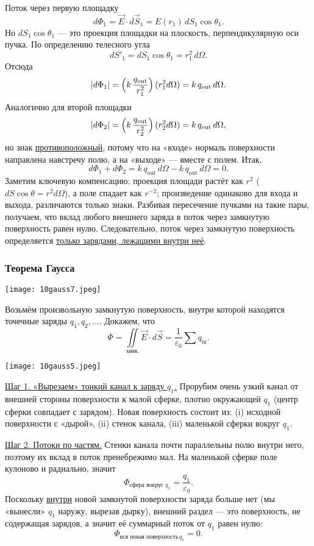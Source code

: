 \documentclass[12pt, a4paper]{article}%
\begin{document}
Поток через первую площадку
\[
d\Phi_1=\vec E\cdot d\vec S_1=E(r_1)\,dS_1\cos\theta_1.
\]
Но \(dS_1\cos\theta_1\) — это проекция площадки на плоскость, перпендикулярную оси пучка. По определению телесного угла
\[
dS'_1=dS_1\cos\theta_1=r_1^2\,d\Omega.
\]
Отсюда
\[
|d\Phi_1|= \Bigl(k\,\frac{q_{\text{out}}}{r_1^2}\Bigr)\,(r_1^2 d\Omega)=k\,q_{\text{out}}\,d\Omega.
\]
Аналогично для второй площадки
\[
|d\Phi_2|= \Bigl(k\,\frac{q_{\text{out}}}{r_2^2}\Bigr)\,(r_2^2 d\Omega)=k\,q_{\text{out}}\,d\Omega,
\]
но знак \underline{противоположный}, потому что на «входе» нормаль поверхности направлена навстречу полю, а на «выходе» — вместе с полем. Итак,
\[
d\Phi_1+d\Phi_2 = k\,q_{\text{out}}\,d\Omega - k\,q_{\text{out}}\,d\Omega = 0.
\]
Заметим ключевую компенсацию: проекция площади растёт как \(r^2\) (\(dS\cos\theta=r^2 d\Omega\)), а поле спадает как \(r^{-2}\); произведение одинаково для входа и выхода, различаются только знаки. Разбивая пересечение пучками на такие пары, получаем, что вклад любого внешнего заряда в поток через замкнутую поверхность равен нулю. Следовательно, поток через замкнутую поверхность определяется \underline{только зарядами, лежащими внутри неё}.

\subsubsection*{Теорема Гаусса}

\begin{center}
\texttt{[image: 10gauss7.jpeg]}
\label{fig:mpr}
\end{center}

Возьмём произвольную замкнутую поверхность, внутри которой находятся точечные заряды $q_1,q_2,\dots$. Докажем, что
\[
\boxed{\,\Phi = \displaystyle \iint\limits_{\text{замк.}} \vec E\cdot d\vec S=\frac{1}{\varepsilon_0}\sum q_{\text{in}}.\,}
\]


\begin{center}
\texttt{[image: 10gauss5.jpeg]}
\label{fig:mpr}
\end{center}


\underline{Шаг 1. «Вырезаем» тонкий канал к заряду $q_1$.} Прорубим очень узкий канал от внешней стороны поверхности к малой сферке, плотно окружающей $q_1$ (центр сферки совпадает с зарядом). Новая поверхность состоит из: (i) исходной поверхности с «дырой», (ii) стенок канала, (iii) маленькой сферки вокруг $q_1$.

\underline{Шаг 2. Потоки по частям.} Стенки канала почти параллельны полю внутри него, поэтому их вклад в поток пренебрежимо мал. На маленькой сферке поле кулоново и радиально, значит
\[
\Phi_{\text{сфера вокруг }q_1}=\frac{q_1}{\varepsilon_0}.
\]
Поскольку \underline{внутри} новой замкнутой поверхности заряда больше нет (мы «вынесли» $q_1$ наружу, вырезав дырку), внешний раздел — это поверхность, не содержащая зарядов, а значит её суммарный поток от $q_1$ равен нулю:
\[
\Phi_{\text{вся новая поверхность}\,q_1}=0.
\]
\end{document}
